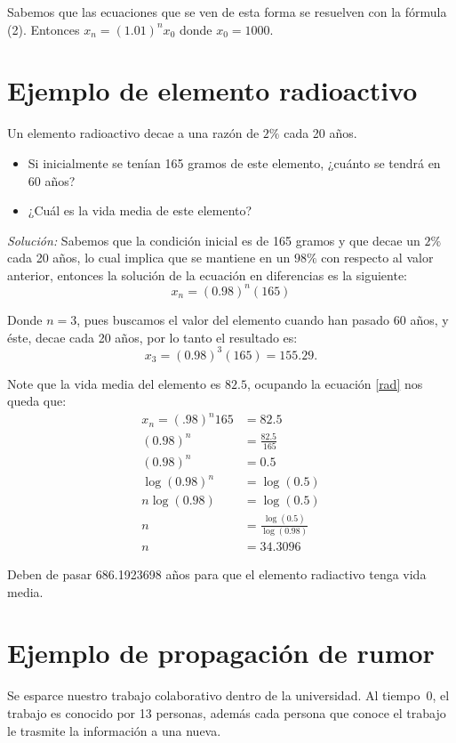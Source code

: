 \documentclass{report}
\begin{document}
Sabemos que las ecuaciones que se ven de esta forma se resuelven con
la fórmula (2).  Entonces $x_n=(1.01)^nx_0$ donde $x_0=1000$.

\section{Ejemplo de elemento radioactivo}

Un elemento radioactivo decae a una razón de $2\%$ cada 20 años.
\begin{itemize}
\item Si inicialmente se tenían 165 gramos de este elemento, ¿cuánto
  se tendrá en 60 años?
 \item ¿Cuál es la vida media de este elemento?
\end{itemize}

\textit{Solución:} Sabemos que la condición inicial es de 165 gramos y
que decae un $2\%$ cada 20 años, lo cual implica que se mantiene en un
$98\%$ con respecto al valor anterior, entonces la solución de la
ecuación en diferencias es la siguiente:
\begin{equation}
  \label{rad}
  x_n=(0.98)^n(165)
\end{equation}

Donde $n=3$, pues buscamos el valor del elemento cuando han pasado 60
años, y éste, decae cada 20 años, por lo tanto el resultado es:
$$x_{3}=(0.98)^3(165)= 155.29.$$

Note que la vida media del elemento es $82.5$, ocupando la ecuación
\ref{rad} nos queda que:
\begin{align*}
  x_n=(.98)^n165&=82.5\\
  (0.98)^n&=\frac{82.5}{\ 165}\\
  (0.98)^n&=0.5\\
  \log{(0.98)^n}&=\log{(0.5)}\\
  n\log{(0.98)}&=\log{(0.5)}\\
  n&=\frac{\log(0.5)}{\log(0.98)}\\
  n&=34.3096     
\end{align*}  

Deben de pasar 686.1923698 años para que el elemento radiactivo tenga
vida media.

\section{Ejemplo de propagación de rumor}

Se esparce nuestro trabajo colaborativo dentro de la universidad. Al
tiempo~0, el trabajo es conocido por 13 personas, además cada persona que
conoce el trabajo le trasmite la información a una nueva.
\end{document}
